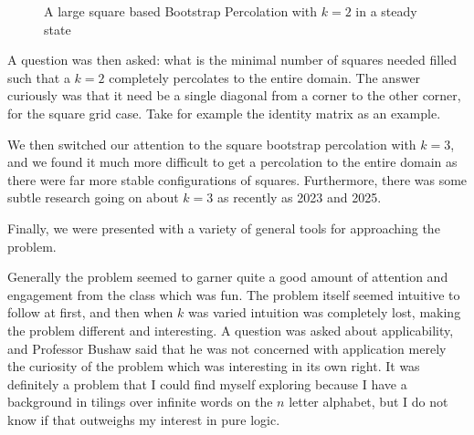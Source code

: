 \documentclass[12pt]{amsart}
\theoremstyle{definition}
\theoremstyle{question}
\begin{document}
\begin{onehalfspace}
\begin{figure}
\begin{tikzpicture}[scale=0.35]
            \end{tikzpicture}
            \caption{A large square based Bootstrap Percolation with $k=2$ in a steady state}
            \label{m_n_grid_steady_state}
        \end{figure}
        A question was then asked: what is the minimal number of squares needed filled such that
        a $k=2$ completely percolates to the entire domain.
        The answer curiously was that it need be a single diagonal from a corner to the other corner,
        for the square grid case.
        Take for example the identity matrix as an example.

        We then switched our attention to the square bootstrap percolation with $k=3$, and we
        found it much more difficult to get a percolation to the entire domain as there were
        far more stable configurations of squares.
        Furthermore, there was some subtle research going on about $k=3$ as recently as 2023 and 2025.

        Finally, we were presented with a variety of general tools for approaching the problem.

        Generally the problem seemed to garner quite a good amount of attention and engagement
        from the class which was fun.
        The problem itself seemed intuitive to follow at first, and then when $k$ was varied
        intuition was completely lost, making the problem different and interesting.
        A question was asked about applicability, and Professor Bushaw said that
        he was not concerned with application merely the curiosity of the problem which
        was interesting in its own right.
        It was definitely a problem that I could find myself exploring because I have
        a background in tilings over infinite words on the $n$ letter alphabet, but
        I do not know if that outweighs my interest in pure logic.
    \end{onehalfspace}
\end{document}
